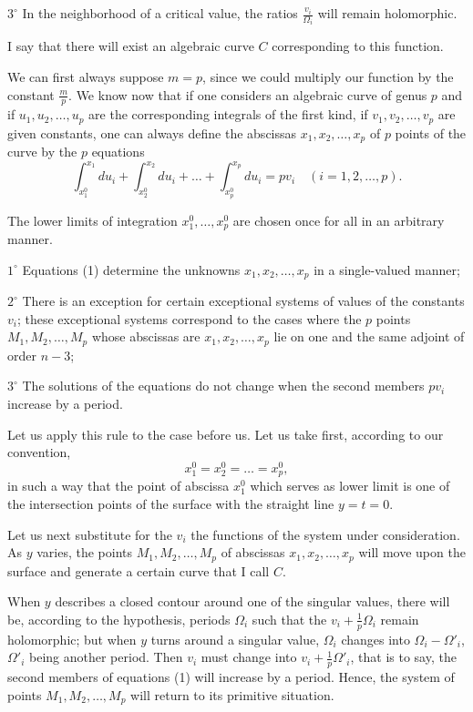 \documentclass{article}
\begin{document}
$3^\circ$ In the neighborhood of a critical value, the ratios $\frac{v_{i}}{\Omega_{i}}$ will remain holomorphic.

I say that there will exist an algebraic curve $C$ corresponding to this function.

We can first always suppose $m = p$, since we could multiply our function by the constant $\frac{m}{p}$. We know now that if one considers an algebraic curve of genus $p$ and if $u_{1}, u_{2}, \ldots, u_{p}$ are the corresponding integrals of the first kind, if $v_{1}, v_{2}, \ldots, v_{p}$ are given constants, one can always define the abscissas $x_{1}, x_{2}, \ldots, x_{p}$ of $p$ points of the curve by the $p$ equations
\[
\int_{x_{1}^{0}}^{x_{1}} du_{i} + \int_{x_{2}^{0}}^{x_{2}} du_{i} + \ldots + \int_{x_{p}^{0}}^{x_{p}} du_{i} = p v_{i} \quad (i = 1, 2, \ldots, p). \tag{1}
\]

The lower limits of integration $x_{1}^{0}, \ldots, x_{p}^{0}$ are chosen once for all in an arbitrary manner.

$1^\circ$ Equations (1) determine the unknowns $x_{1}, x_{2}, \ldots, x_{p}$ in a single-valued manner;

$2^\circ$ There is an exception for certain exceptional systems of values of the constants $v_{i}$; these exceptional systems correspond to the cases where the $p$ points $M_{1}, M_{2}, \ldots, M_{p}$ whose abscissas are $x_{1}, x_{2}, \ldots, x_{p}$ lie on one and the same adjoint of order $n - 3$;

$3^\circ$ The solutions of the equations do not change when the second members $p v_{i}$ increase by a period.

Let us apply this rule to the case before us. Let us take first, according to our convention,
\[
x_{1}^{0} = x_{2}^{0} = \ldots = x_{p}^{0},
\]
in such a way that the point of abscissa $x_{1}^{0}$ which serves as lower limit is one of the intersection points of the surface with the straight line $y = t = 0$.

Let us next substitute for the $v_{i}$ the functions of the system under consideration. As $y$ varies, the points $M_{1}, M_{2}, \ldots, M_{p}$ of abscissas $x_{1}, x_{2}, \ldots, x_{p}$ will move upon the surface and generate a certain curve that I call $C$.

When $y$ describes a closed contour around one of the singular values, there will be, according to the hypothesis, periods $\Omega_{i}$ such that the $v_{i} + \frac{1}{p} \Omega_{i}$ remain holomorphic; but when $y$ turns around a singular value, $\Omega_{i}$ changes into $\Omega_{i} - \Omega'_{i}$, $\Omega'_{i}$ being another period. Then $v_{i}$ must change into $v_{i} + \frac{1}{p} \Omega'_{i}$, that is to say, the second members of equations (1) will increase by a period. Hence, the system of points $M_{1}, M_{2}, \ldots, M_{p}$ will return to its primitive situation.
\end{document}
